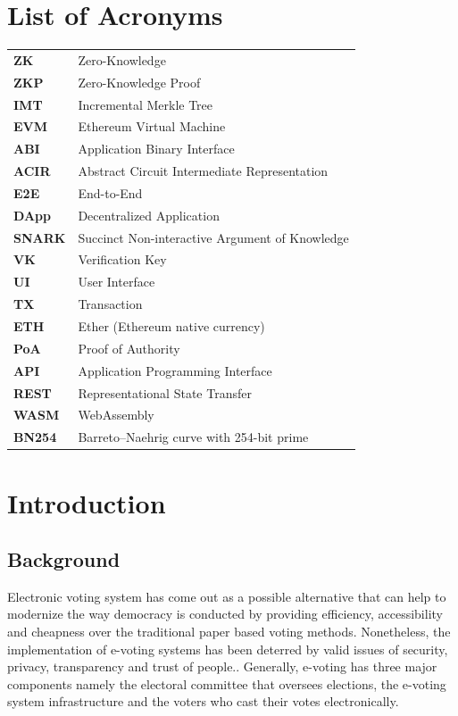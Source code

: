 \documentclass[12pt, a4paper]{report}
\begin{document}
\listoftables
\newpage

\chapter*{List of Acronyms}
\begin{tabular}{ll}
\textbf{ZK} & Zero-Knowledge \\
\textbf{ZKP} & Zero-Knowledge Proof \\
\textbf{IMT} & Incremental Merkle Tree \\
\textbf{EVM} & Ethereum Virtual Machine \\
\textbf{ABI} & Application Binary Interface \\
\textbf{ACIR} & Abstract Circuit Intermediate Representation \\
\textbf{E2E} & End-to-End \\
\textbf{DApp} & Decentralized Application \\
\textbf{SNARK} & Succinct Non-interactive Argument of Knowledge \\
\textbf{VK} & Verification Key \\
\textbf{UI} & User Interface \\
\textbf{TX} & Transaction \\
\textbf{ETH} & Ether (Ethereum native currency) \\
\textbf{PoA} & Proof of Authority \\
\textbf{API} & Application Programming Interface \\
\textbf{REST} & Representational State Transfer \\
\textbf{WASM} & WebAssembly \\
\textbf{BN254} & Barreto--Naehrig curve with 254-bit prime \\
\end{tabular}
\newpage


\renewcommand{\thepage}{\arabic{page}}
\setcounter{page}{1}

\chapter{Introduction}

\section{Background}
Electronic voting system has come out as a possible alternative that can help to modernize the way democracy is conducted by providing efficiency, accessibility and cheapness over the traditional paper based voting methods. Nonetheless, the implementation of e-voting systems has been deterred by valid issues of security, privacy, transparency and trust of people.\cite{hajian2024blockchain}. Generally, e-voting has three major components namely the electoral committee that oversees elections, the e-voting system infrastructure and the voters who cast their votes electronically.
\end{document}
